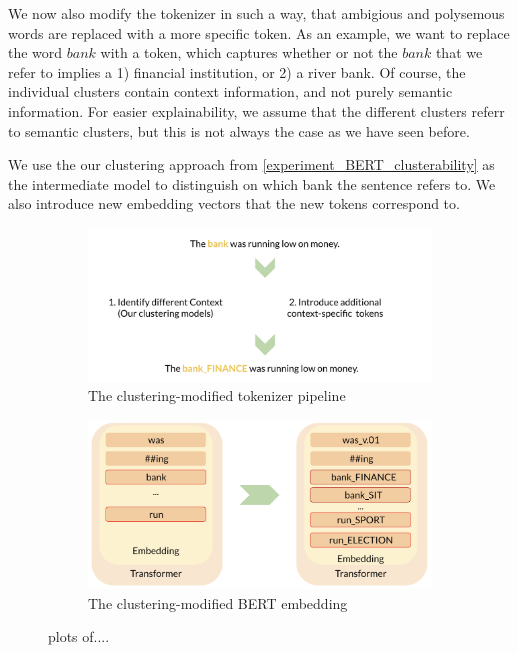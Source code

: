 \documentclass[a4paper,12pt,twoside,openright]{report}
\begin{document}
We now also modify the tokenizer in such a way, that ambigious and polysemous words are replaced with a more specific token.
As an example, we want to replace the word $bank$ with a token, which captures whether or not the $bank$ that we refer to implies a 1) financial institution, or 2) a river bank.
Of course, the individual clusters contain context information, and not purely semantic information.
For easier explainability, we assume that the different clusters referr to semantic clusters, but this is not always the case as we have seen before.

We use the our clustering approach from \ref{experiment_BERT_clusterability} as the intermediate model to distinguish on which bank the sentence refers to.
We also introduce new embedding vectors that the new tokens correspond to.

\begin{figure}[H]
\center
\begin{subfigure}{.5\textwidth}
  \centering
  \includegraphics[width=\linewidth]{./assets/experiments/pipeline_tokenizer_BERnie_meaning.png}
  \caption{The clustering-modified tokenizer pipeline}
  \label{fig:sfig1}
\end{subfigure}%
\begin{subfigure}{.55\textwidth}
  \centering
  \includegraphics[width=\linewidth]{./assets/experiments/pipeline_model_BERnie_meaning_embedding.png}
  \caption{The clustering-modified BERT embedding}
  \label{fig:sfig2}
\end{subfigure}
\caption{plots of....}
\label{fig:fig}
\end{figure}
\end{document}
